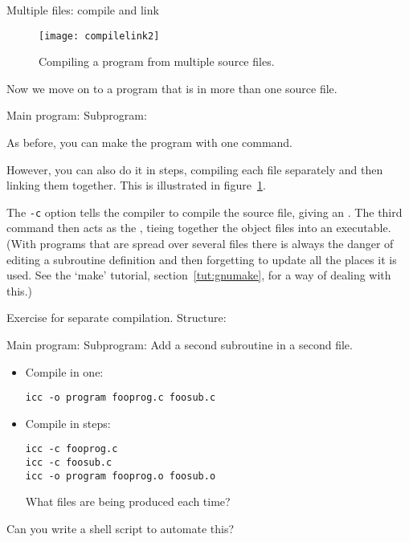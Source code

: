  {Multiple files: compile and link}

\begin{figure}[ht]
  \texttt{[image: compilelink2]}
  \caption{Compiling a program from multiple source files.}
  \label{fig:compilelink2}
\end{figure}

Now we move on to a program that is in more than one source file.

\begin{multicols}{2}
  Main program: 
  \columnbreak
  Subprogram: 
\end{multicols}

As before, you can make the program with one command.


However, you can also do it in steps, compiling each file separately
and then linking them together.
This is illustrated in figure~\ref{fig:compilelink2}.


The \texttt{-c} option tells the compiler to compile the source file,
giving an . The third command then acts as the
, tieing together the object files into an
executable. (With programs that are spread over several files there is
always the danger of editing a subroutine definition and then
forgetting to update all the places it is used. See the `make'
tutorial, section~\ref{tut:gnumake}, for a way of dealing with this.) 

\begin{exercise}
  \label{ex:compile3}

  Exercise for separate compilation. Structure:
\begin{multicols}{2}
  Main program: 
  \columnbreak
  Subprogram: 
  Add a second subroutine in a second file.
\end{multicols}

  \begin{itemize}
  \item Compile in one:
\begin{verbatim}
icc -o program fooprog.c foosub.c
\end{verbatim}
\item Compile in steps:
\begin{verbatim}
icc -c fooprog.c
icc -c foosub.c
icc -o program fooprog.o foosub.o
\end{verbatim}
What files are being produced each time?
  \end{itemize}
Can you write a shell script to automate this?
\end{exercise}

